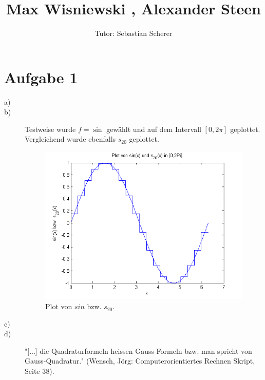 \documentclass[11pt,a4paper,ngerman]{article}
\author{Tutor: Sebastian Scherer}
\date{}
\title{Max Wisniewski , Alexander Steen}
\begin{document}

\maketitle
\thispagestyle{fancy}



\section*{Aufgabe 1}

\begin{description}
\item[a)]
\item[b)] Testweise wurde $f = \sin$ gewählt und auf dem Intervall $[0,2 \pi]$ geplottet. Vergleichend wurde ebenfalls $s_{20}$ geplottet. 


\begin{figure}[ht]
\centering
	\includegraphics[scale=0.8]{quadneubeispiel}
\caption{Plot von $sin$ bzw. $s_{20}$.}
\end{figure}
\item[c)]
\item[d)] "[...] die Quadraturformeln heissen Gauss-Formeln bzw. man spricht von Gauss-Quadratur." (Wensch, Jörg: Computerorientiertes Rechnen Skript, Seite 38).
\end{description}
\end{document}
